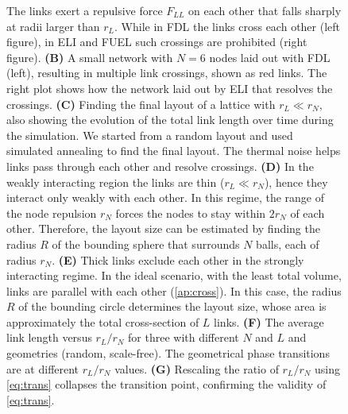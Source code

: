 \documentclass[endfloats,nofootinbib,preprint,floatfix,titlepage,superscriptaddress]{revtex4} %
\begin{document}
\begin{figure}
{    The links exert a repulsive force $F_{LL}$  on each other that falls sharply at radii larger than $r_L$. 
    While in FDL the links cross each other (left figure), in ELI and FUEL such crossings are prohibited (right figure). 
    {\bf(B)} A small network with $N=6$ nodes laid out with FDL (left), resulting in multiple link crossings, shown as red links.   
    The right plot shows how the network laid out by ELI that resolves the crossings.
    {\bf (C)} Finding the final layout of a lattice with $r_L\ll r_N$, also showing the evolution of the total link length over time during the simulation. 
    We started from a random layout and used simulated annealing to find the final layout.
    The thermal noise helps links pass through each other and resolve crossings.
    {\bf (D)} In the weakly interacting region the links are thin ($r_L\ll r_N$), hence they interact only weakly with each other. 
    In this regime, the range of the node repulsion $r_N$ forces the nodes to stay within $2r_N$ of each other. 
    Therefore, the layout size can be estimated by finding the radius $R$ of the bounding sphere that surrounds $N$ balls, each of radius $r_N$. 
    {\bf (E)} Thick links exclude each other  in the strongly interacting regime. 
    In the ideal scenario, with the least total volume, links are parallel with each other (\ref{ap:cross}). 
    In this case, the radius $R$ of the bounding circle determines the layout size, whose area is approximately the total cross-section of $L$ links. 
    {\bf (F)} The average link length versus $r_L/r_N$ for three with different $N$ and $L$ and geometries (random, scale-free). 
    The geometrical phase transitions are at different $r_L/r_N$ values. 
    {\bf (G)} Rescaling the ratio of $r_L/r_N$ using \eqref{eq:trans}  collapses the transition point, %
    confirming the validity of \eqref{eq:trans}. }
    \label{fig:trans}
    \label{fig:crs-lat}
\end{figure}
\end{document}
